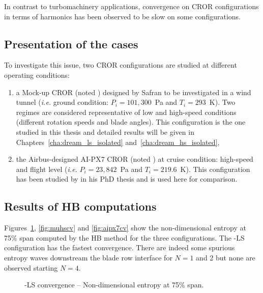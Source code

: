 
In contrast to turbomachinery applications, convergence
on CROR configurations
in terms of harmonics has been observed to be
slow on some configurations.

\subsection{Presentation of the cases}

To investigate this issue, two CROR configurations are studied at
different operating conditions:
\begin{enumerate}
\item a Mock-up CROR (noted \mockup) designed by Safran to be
  investigated in a wind tunnel (\emph{i.e.} ground condition:
  $P_i=101,300$~Pa and $T_i=293$~K). Two regimes are considered
  representative of low and high-speed conditions (different rotation
  speeds and blade angles). This configuration is the one
  studied in this thesis and detailed results will be given 
  in Chapters~\ref{cha:dream_ls_isolated} and~\ref{cha:dream_hs_isolated},
\item the Airbus-designed AI-PX7 CROR (noted \aipx) at cruise
  condition: high-speed 
  and flight level (\emph{i.e.}  $P_i=23,842$~Pa and
  $T_i=219.6$~K). This configuration has been studied by
  \citet{ThesisFrancois} in his PhD thesis and is used
  here for comparison.
\end{enumerate}

\subsection{Results of HB computations}

Figures~\ref{fig:mulscv},
\ref{fig:muhscv} and \ref{fig:aipx7cv} show the non-dimensional
entropy at 75\% span computed by the HB method for the three
configurations. The \mockup-LS configuration has the fastest
convergence. There are indeed some spurious entropy waves downstream the blade
row interface for $N=1$ and 2 but none are observed
starting $N=4$.
\begin{figure}
  \centering
  \caption{\mockup-LS convergence -- Non-dimensional entropy at 75\% span.}
  \label{fig:mulscv}
\end{figure}

